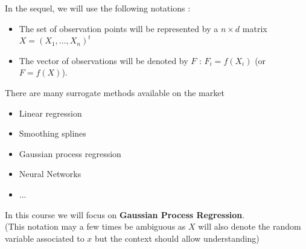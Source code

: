 \begin{frame}{}
In the sequel, we will use the following notations :
\begin{itemize}
	\item The set of observation points will be represented by a $n \times d$ matrix $X=(X_1, ..., X_n)^t$
	\item The vector of observations will be denoted by $F$ : $F_i=f(X_i)$ (or $F=f(X)$).
\end{itemize}
There are many surrogate methods available on the market
\begin{itemize}
	\item Linear regression
	\item Smoothing splines
	\item Gaussian process regression
	\item Neural Networks
    \item ...
\end{itemize}
In this course we will focus on \textbf{Gaussian Process Regression}. \\
{\tiny (This notation may a few times be ambiguous as $X$ will also denote the random variable associated to $x$
but the context should allow understanding)}
\end{frame}


